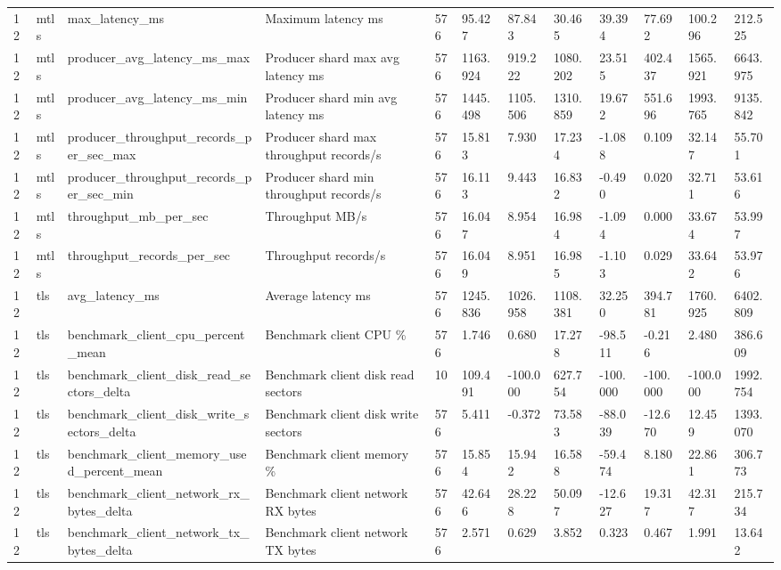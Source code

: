 \begin{longtable}{llllllllllll}
12 & mtls & max\_latency\_ms & Maximum latency ms & 576 & 95.427 & 87.843 & 30.465 & 39.394 & 77.692 & 100.296 & 212.525 \\
12 & mtls & producer\_avg\_latency\_ms\_max & Producer shard max avg latency ms & 576 & 1163.924 & 919.222 & 1080.202 & 23.515 & 402.437 & 1565.921 & 6643.975 \\
12 & mtls & producer\_avg\_latency\_ms\_min & Producer shard min avg latency ms & 576 & 1445.498 & 1105.506 & 1310.859 & 19.672 & 551.696 & 1993.765 & 9135.842 \\
12 & mtls & producer\_throughput\_records\_per\_sec\_max & Producer shard max throughput records/s & 576 & 15.813 & 7.930 & 17.234 & -1.088 & 0.109 & 32.147 & 55.701 \\
12 & mtls & producer\_throughput\_records\_per\_sec\_min & Producer shard min throughput records/s & 576 & 16.113 & 9.443 & 16.832 & -0.490 & 0.020 & 32.711 & 53.616 \\
12 & mtls & throughput\_mb\_per\_sec & Throughput MB/s & 576 & 16.047 & 8.954 & 16.984 & -1.094 & 0.000 & 33.674 & 53.997 \\
12 & mtls & throughput\_records\_per\_sec & Throughput records/s & 576 & 16.049 & 8.951 & 16.985 & -1.103 & 0.029 & 33.642 & 53.976 \\
12 & tls & avg\_latency\_ms & Average latency ms & 576 & 1245.836 & 1026.958 & 1108.381 & 32.250 & 394.781 & 1760.925 & 6402.809 \\
12 & tls & benchmark\_client\_cpu\_percent\_mean & Benchmark client CPU \% & 576 & 1.746 & 0.680 & 17.278 & -98.511 & -0.216 & 2.480 & 386.609 \\
12 & tls & benchmark\_client\_disk\_read\_sectors\_delta & Benchmark client disk read sectors & 10 & 109.491 & -100.000 & 627.754 & -100.000 & -100.000 & -100.000 & 1992.754 \\
12 & tls & benchmark\_client\_disk\_write\_sectors\_delta & Benchmark client disk write sectors & 576 & 5.411 & -0.372 & 73.583 & -88.039 & -12.670 & 12.459 & 1393.070 \\
12 & tls & benchmark\_client\_memory\_used\_percent\_mean & Benchmark client memory \% & 576 & 15.854 & 15.942 & 16.588 & -59.474 & 8.180 & 22.861 & 306.773 \\
12 & tls & benchmark\_client\_network\_rx\_bytes\_delta & Benchmark client network RX bytes & 576 & 42.646 & 28.228 & 50.097 & -12.627 & 19.317 & 42.317 & 215.734 \\
12 & tls & benchmark\_client\_network\_tx\_bytes\_delta & Benchmark client network TX bytes & 576 & 2.571 & 0.629 & 3.852 & 0.323 & 0.467 & 1.991 & 13.642 \\

\end{longtable}
